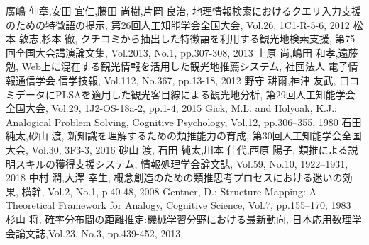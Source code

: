 \documentclass[journal]{IAENGtran}
\begin{document}
%
%
%
\begin{thebibliography}{1}

    廣嶋 伸章,安田 宜仁,藤田 尚樹,片岡 良治,
      地理情報検索におけるクエリ入力支援のための特徴語の提示,
      第26回人工知能学会全国大会, Vol.26, 1C1-R-5-6, 2012
    松本 敦志,杉本 徹,
      クチコミから抽出した特徴語を利用する観光地検索支援,
      第75回全国大会講演論文集, Vol.2013, No.1, pp.307-308, 2013
    上原 尚,嶋田 和孝,遠藤 勉,
      Web上に混在する観光情報を活用した観光地推薦システム,
      社団法人 電子情報通信学会,信学技報, Vol.112, No.367, pp.13-18, 2012
    野守 耕爾,神津 友武,
      口コミデータにPLSAを適用した観光客目線による観光地分析,
      第29回人工知能学会全国大会, Vol.29, 1J2-OS-18a-2, pp.1-4, 2015
    Gick, M.L. and Holyoak, K.J.:
    Analogical Problem Solving,
    Cognitive Psychology, Vol.12, pp.306–355, 1980
    石田 純太,砂山 渡,
      新知識を理解するための類推能力の育成,
      第30回人工知能学会全国大会, Vol.30, 3F3-3, 2016
    砂山 渡, 石田 純太,川本 佳代,西原 陽子,
      類推による説明スキルの獲得支援システム,
      情報処理学会論文誌, Vol.59, No.10, 1922–1931, 2018
    中村 潤,大澤 幸生,
      概念創造のための類推思考プロセスにおける迷いの効果,
      横幹, Vol.2, No.1, p.40-48, 2008
    Gentner, D.: Structure-Mapping:
    A Theoretical Framework for Analogy,
    Cognitive Science, Vol.7, pp.155–170, 1983
      杉山 将,
      確率分布間の距離推定:機械学習分野における最新動向,
      日本応用数理学会論文誌,Vol.23, No.3, pp.439-452, 2013

\end{thebibliography}
\end{document}
